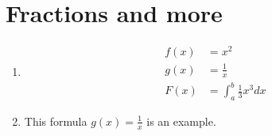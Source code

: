 \documentclass[fleqn]{article}
\begin{document}
	\section{Fractions and more}
	
	\begin{enumerate}
		
		\item
		\begin{align*}
			f(x) &= x^2 \\
			g(x) &= \frac{1}{x} \\
			F(x) &= \int_a^b \frac{1}{3}x^3 dx
		\end{align*}
	
		\item
		This formula $ g(x) = \frac{1}{x} $ is an example. \\ 

	\end{enumerate}
	
\end{document}
